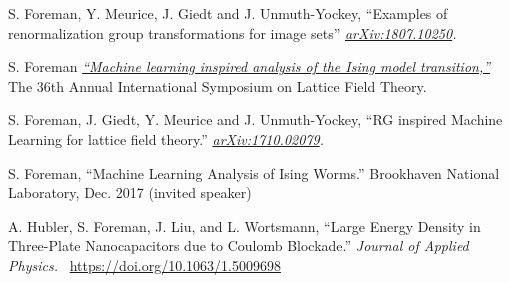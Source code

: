 \vspace{-1.75ex}


\begin{cvparagraph}

    \vspace{1.5ex}
    \begin{cvitems}
    \item {S. Foreman, Y. Meurice, J. Giedt and J. Unmuth-Yockey, ``Examples of
            renormalization group transformations for image sets''
            \textit{\href{https://arxiv.org/abs/1807.10250}{arXiv:1807.10250}.}}
    \item {S. Foreman
        \textit{\href{https://indico.fnal.gov/event/15949/session/16/contribution/193}{``Machine
            learning inspired analysis of the Ising model transition,''}} The
            36th Annual International Symposium on Lattice Field Theory.}
    \item {S. Foreman, J. Giedt, Y. Meurice and J. Unmuth-Yockey, ``RG inspired
            Machine Learning for lattice field theory.''
            \textit{\href{https://arxiv.org/abs/1710.02079}{arXiv:1710.02079}.}}
    \item {S. Foreman, ``Machine Learning Analysis of Ising Worms.'' Brookhaven
        National Laboratory, Dec. 2017 (invited speaker)}
    \item {A. Hubler, S. Foreman, J. Liu, and L. Wortsmann, ``Large Energy
            Density in Three-Plate Nanocapacitors due to Coulomb Blockade.''
            \textit{Journal of Applied Physics.}
    ~\href{https://doi.org/10.1063/1.5009698}{https://doi.org/10.1063/1.5009698}}
   \end{cvitems}
\end{cvparagraph}


